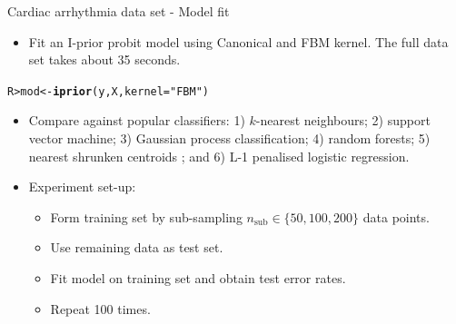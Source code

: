 \documentclass{beamer}\usepackage[]{graphicx}\usepackage[]{color}
\makeatletter
\newcommand{\hlstr}[1]{\textcolor[rgb]{0.192,0.494,0.8}{#1}}%
\newcommand{\hlstd}[1]{\textcolor[rgb]{0.345,0.345,0.345}{#1}}%
\newcommand{\hlkwb}[1]{\textcolor[rgb]{0.69,0.353,0.396}{#1}}%
\newcommand{\hlkwc}[1]{\textcolor[rgb]{0.333,0.667,0.333}{#1}}%
\newcommand{\hlkwd}[1]{\textcolor[rgb]{0.737,0.353,0.396}{\textbf{#1}}}%
\newenvironment{kframe}{%
 \def\at@end@of@kframe{}%
 \ifinner\ifhmode%
  \def\at@end@of@kframe{\end{minipage}}%
  \begin{minipage}{\columnwidth}%
 \fi\fi%
 \def\FrameCommand##1{\hskip\@totalleftmargin \hskip-\fboxsep
 \colorbox{shadecolor}{##1}\hskip-\fboxsep
     \hskip-\linewidth \hskip-\@totalleftmargin \hskip\columnwidth}%
 \MakeFramed {\advance\hsize-\width
   \@totalleftmargin\z@ \linewidth\hsize
   \@setminipage}}%
 {\par\unskip\endMakeFramed%
 \at@end@of@kframe}
\newenvironment{knitrout}{}{} %
\makeatother
\begin{document}
\begin{frame}[fragile]{Cardiac arrhythmia data set - Model fit}
\vspace{-20pt}
\begin{itemize}
  \item Fit an I-prior probit model using Canonical and FBM kernel. The full data set takes about 35 seconds.
\end{itemize}
\vspace{-5pt}
\begin{knitrout}\small
{}\color{fgcolor}\begin{kframe}
\begin{alltt}
\hlstd{R> }\hlstd{mod} \hlkwb{<-} \hlkwd{iprior}\hlstd{(y, X,} \hlkwc{kernel} \hlstd{=} \hlstr{"FBM"}\hlstd{)}
\end{alltt}
\end{kframe}
\end{knitrout}
\vspace{-10pt}
\begin{itemize}
  \item Compare against popular classifiers: 1) $k$-nearest neighbours; 2) support vector machine; 3) Gaussian process classification; 4) random forests; 5) nearest shrunken centroids \parencite{tibshirani2003class}; and 6) L-1 penalised logistic regression.
  \vspace{0.5em}
  \item Experiment set-up:
  \begin{itemize}
    \item Form training set by sub-sampling $n_{\text{sub}} \in \{50, 100, 200 \}$ data points.
    \item Use remaining data as test set.
    \item Fit model on training set and obtain test error rates.
    \item Repeat 100 times.
  \end{itemize}
\end{itemize}

\end{frame}
\end{document}
